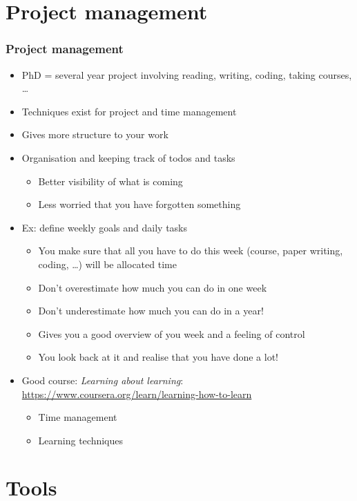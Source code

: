 \documentclass[screen, aspectratio=43]{beamer}
\begin{document}
\section{Project management}
\begin{frame}
  \frametitle{Project management}
  \begin{itemize}
  \item PhD = several year project involving reading, writing, coding, taking courses, \ldots
  \item Techniques exist for project and time management
  \item Gives more structure to your work
  \item Organisation and keeping track of todos and tasks
    \begin{itemize}
    \item Better visibility of what is coming
    \item Less worried that you have forgotten something
    \end{itemize}
  \item Ex: define weekly goals and daily tasks
    \begin{itemize}
    \item You make sure that all you have to do this week (course, paper writing, coding, \ldots) will be allocated time
    \item Don't overestimate how much you can do in one week
    \item Don't underestimate how much you can do in a year!
    \item Gives you a good overview of you week and a feeling of control
    \item You look back at it and realise that you have done a lot!
    \end{itemize}
  \item Good course: \emph{Learning about learning}: \url{https://www.coursera.org/learn/learning-how-to-learn}
    \begin{itemize}
    \item Time management
    \item Learning techniques
    \end{itemize}
  \end{itemize}
\end{frame}

\section{Tools}
\end{document}
